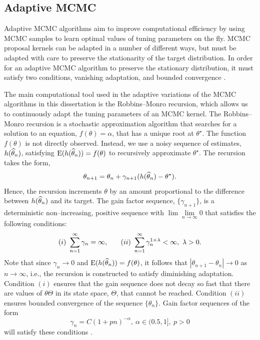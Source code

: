 \subsection{Adaptive MCMC}
\label{subsec:adaptive_mcmc}

Adaptive MCMC algorithms aim to improve computational efficiency by using MCMC samples to learn optimal values of tuning parameters on the fly. MCMC proposal kernels can be adapted in a number of different ways, but must be adapted with care to preserve the stationarity of the target distribution. In order for an adaptive MCMC algorithm to preserve the stationary distribution, it must satisfy two conditions, vanishing adaptation, and bounded convergence \cite{andrieu2008tutorial}.

The main computational tool used in the adaptive variations of the MCMC algorithms in this dissertation is the Robbins--Monro recursion, which allows us to continuously adapt the tuning parameters of an MCMC kernel. The Robbins--Monro recursion is a stochastic approximation algorithm that searches for a solution to an equation, $ f(\theta) = \alpha $, that has a unique root at $ \theta^\star $. The function $ f(\theta) $ is not directly observed. Instead, we use a noisy sequence of estimates, $ h(\widehat{\theta}_n) $, satisfying $ \mathrm{E}(h(\widehat{\theta}_n)) = f(\theta) $ to recursively approximate $ \theta^\star $. The recursion takes the form, $$\theta_{n+1} = \theta_n + \gamma_{n+1}(h(\widehat{\theta}_n) - \theta^\star).$$
Hence, the recursion increments $ \theta $ by an amount proportional to the difference between $ h(\widehat{\theta}_n) $ and its target.  The gain factor sequence, $ \lbrace\gamma_{n+1}\rbrace $, is a deterministic non--increasing, positive sequence with $ \lim\lim\limits_{n\rightarrow\infty}0 $ that satisfies the following conditions: $$(i)\ \sum_{n=1}^\infty \gamma_n = \infty,\hspace{0.25in} (ii)\  \sum_{n=1}^\infty\gamma_n^{1+\lambda} < \infty,\ \lambda > 0.$$
Note that since $ \gamma_n\rightarrow0 $ and $ \mathrm{E}(h(\widehat{\theta}_n))= f(\theta) $, it follows that $ |\theta_{n+1} - \theta_n|\rightarrow0 $ as $ n\rightarrow\infty $, i.e., the recursion is constructed to satisfy diminishing adaptation. Condition $ (i) $ ensures that the gain sequence does not decay so fast that there are values of $ \theta \Theta $ in its state space, $ \Theta $, that cannot be reached. Condition $ (ii) $ ensures bounded convergence of the sequence $ \lbrace\theta_n\rbrace $. Gain factor sequences of the form \begin{equation}
\label{eqn:gain_factor_seq}
 \gamma_n = C(1+pn)^{-\alpha},\ \alpha\in(0.5,1],\ p>0
\end{equation}  will satisfy these conditions \cite{andrieu2008tutorial,liang2011advanced}. 


